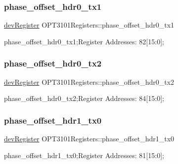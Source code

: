 \subsubsection{\texorpdfstring{phase\+\_\+offset\+\_\+hdr0\+\_\+tx1}{phase\_offset\_hdr0\_tx1}}
{\footnotesize\ttfamily \mbox{\hyperlink{classdev_register}{dev\+Register}} O\+P\+T3101\+Registers\+::phase\+\_\+offset\+\_\+hdr0\+\_\+tx1}



phase\+\_\+offset\+\_\+hdr0\+\_\+tx1;Register Addresses\+: 82\mbox{[}15\+:0\mbox{]}; 

\mbox{\label{class_o_p_t3101_registers_aca4709b359b3002aa5b1fda1db2a6b2c}} 
\subsubsection{\texorpdfstring{phase\+\_\+offset\+\_\+hdr0\+\_\+tx2}{phase\_offset\_hdr0\_tx2}}
{\footnotesize\ttfamily \mbox{\hyperlink{classdev_register}{dev\+Register}} O\+P\+T3101\+Registers\+::phase\+\_\+offset\+\_\+hdr0\+\_\+tx2}



phase\+\_\+offset\+\_\+hdr0\+\_\+tx2;Register Addresses\+: 84\mbox{[}15\+:0\mbox{]}; 

\mbox{\label{class_o_p_t3101_registers_af64b9a5c99582c83b7c3a546f9d14588}} 
\subsubsection{\texorpdfstring{phase\+\_\+offset\+\_\+hdr1\+\_\+tx0}{phase\_offset\_hdr1\_tx0}}
{\footnotesize\ttfamily \mbox{\hyperlink{classdev_register}{dev\+Register}} O\+P\+T3101\+Registers\+::phase\+\_\+offset\+\_\+hdr1\+\_\+tx0}



phase\+\_\+offset\+\_\+hdr1\+\_\+tx0;Register Addresses\+: 81\mbox{[}15\+:0\mbox{]}; 

